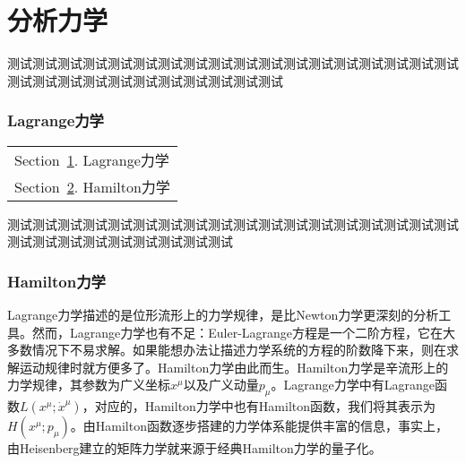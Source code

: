 \part{分析力学}\label{Part:Analytical}
	测试测试测试测试测试测试测试测试测试测试测试测试测试测试测试测试测试测试测试测试测试测试测试测试测试测试测试测试测试
	\section{Lagrange力学}\label{sec:Lagrange}
		\begin{margintable}\vspace{1.4in}\footnotesize
			\begin{tabularx}{\marginparwidth}{|X}
			Section~\ref{sec:Lagrange}. Lagrange力学\\
			Section~\ref{sec:Hamilton}. Hamilton力学\\
			\end{tabularx}
		\end{margintable}
		测试测试测试测试测试测试测试测试测试测试测试测试测试测试测试测试测试测试测试测试测试测试测试测试测试测试测试
		\newpage
	\section{Hamilton力学}\label{sec:Hamilton}
		Lagrange力学描述的是位形流形上的力学规律，是比Newton力学更深刻的分析工具。然而，Lagrange力学也有不足：Euler-Lagrange方程是一个二阶方程，它在大多数情况下不易求解。如果能想办法让描述力学系统的方程的阶数降下来，则在求解运动规律时就方便多了。Hamilton力学由此而生。Hamilton力学是辛流形上的力学规律，其参数为广义坐标$x^\mu$以及广义动量$p_\mu$。Lagrange力学中有Lagrange函数$L(x^\mu;{\dot{x}}^\mu)$，对应的，Hamilton力学中也有Hamilton函数，我们将其表示为$H(x^\mu;p_\mu)$。由Hamilton函数逐步搭建的力学体系能提供丰富的信息，事实上，由Heisenberg建立的矩阵力学就来源于经典Hamilton力学的量子化。
